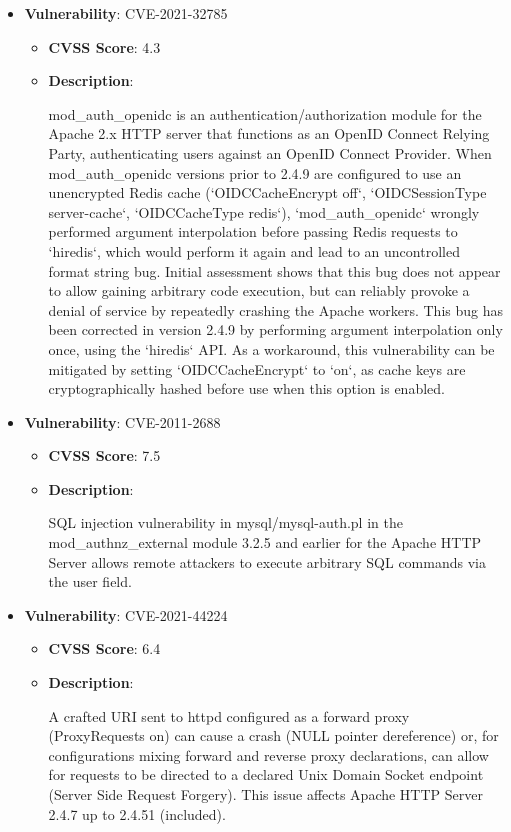\documentclass{article}
\begin{document}
\begin{itemize}
        \item \textbf{Vulnerability}: CVE-2021-32785
        \begin{itemize}
            \item \textbf{CVSS Score}:  4.3 
            \item \textbf{Description}:
            \parbox[t]{0.9\linewidth}{
                \ttfamily mod\_auth\_openidc is an authentication/authorization module for the Apache 2.x HTTP server that functions as an OpenID Connect Relying Party, authenticating users against an OpenID Connect Provider. When mod\_auth\_openidc versions prior to 2.4.9 are configured to use an unencrypted Redis cache (`OIDCCacheEncrypt off`, `OIDCSessionType server-cache`, `OIDCCacheType redis`), `mod\_auth\_openidc` wrongly performed argument interpolation before passing Redis requests to `hiredis`, which would perform it again and lead to an uncontrolled format string bug. Initial assessment shows that this bug does not appear to allow gaining arbitrary code execution, but can reliably provoke a denial of service by repeatedly crashing the Apache workers. This bug has been corrected in version 2.4.9 by performing argument interpolation only once, using the `hiredis` API. As a workaround, this vulnerability can be mitigated by setting `OIDCCacheEncrypt` to `on`, as cache keys are cryptographically hashed before use when this option is enabled.
            }
        \end{itemize}
    
        \item \textbf{Vulnerability}: CVE-2011-2688
        \begin{itemize}
            \item \textbf{CVSS Score}:  7.5 
            \item \textbf{Description}:
            \parbox[t]{0.9\linewidth}{
                \ttfamily SQL injection vulnerability in mysql/mysql-auth.pl in the mod\_authnz\_external module 3.2.5 and earlier for the Apache HTTP Server allows remote attackers to execute arbitrary SQL commands via the user field.
            }
        \end{itemize}
    
        \item \textbf{Vulnerability}: CVE-2021-44224
        \begin{itemize}
            \item \textbf{CVSS Score}:  6.4 
            \item \textbf{Description}:
            \parbox[t]{0.9\linewidth}{
                \ttfamily A crafted URI sent to httpd configured as a forward proxy (ProxyRequests on) can cause a crash (NULL pointer dereference) or, for configurations mixing forward and reverse proxy declarations, can allow for requests to be directed to a declared Unix Domain Socket endpoint (Server Side Request Forgery). This issue affects Apache HTTP Server 2.4.7 up to 2.4.51 (included).
            }
        \end{itemize}
    

\end{itemize}
\end{document}
